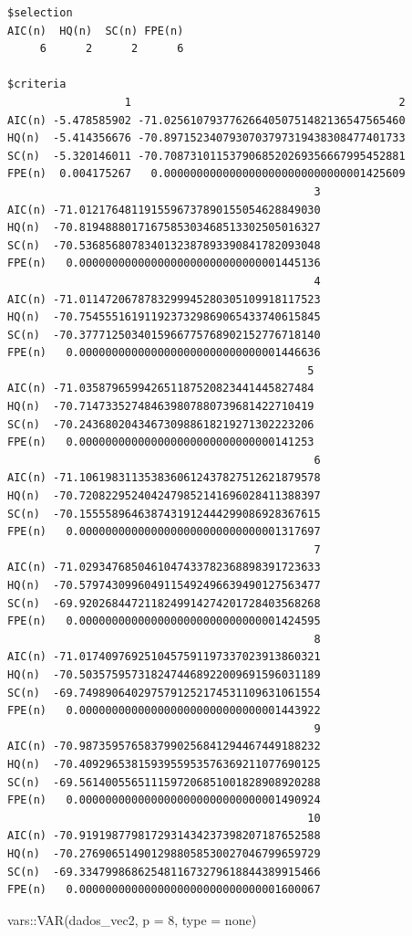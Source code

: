 \documentclass[
  letterpaper,
  DIV=11,
  numbers=noendperiod]{scrartcl}
\newenvironment{Shaded}{\begin{snugshade}}{\end{snugshade}}
\newcommand{\AttributeTok}[1]{\textcolor[rgb]{0.40,0.45,0.13}{#1}}
\newcommand{\DecValTok}[1]{\textcolor[rgb]{0.68,0.00,0.00}{#1}}
\newcommand{\FunctionTok}[1]{\textcolor[rgb]{0.28,0.35,0.67}{#1}}
\newcommand{\NormalTok}[1]{\textcolor[rgb]{0.00,0.23,0.31}{#1}}
\newcommand{\SpecialCharTok}[1]{\textcolor[rgb]{0.37,0.37,0.37}{#1}}
\newcommand{\StringTok}[1]{\textcolor[rgb]{0.13,0.47,0.30}{#1}}
\begin{document}
\begin{verbatim}
$selection
AIC(n)  HQ(n)  SC(n) FPE(n) 
     6      2      2      6 

$criteria
                  1                                         2
AIC(n) -5.478585902 -71.0256107937762664050751482136547565460
HQ(n)  -5.414356676 -70.8971523407930703797319438308477401733
SC(n)  -5.320146011 -70.7087310115379068520269356667995452881
FPE(n)  0.004175267   0.0000000000000000000000000000001425609
                                               3
AIC(n) -71.0121764811915596737890155054628849030
HQ(n)  -70.8194888017167585303468513302505016327
SC(n)  -70.5368568078340132387893390841782093048
FPE(n)   0.0000000000000000000000000000001445136
                                               4
AIC(n) -71.0114720678783299945280305109918117523
HQ(n)  -70.7545551619119237329869065433740615845
SC(n)  -70.3777125034015966775768902152776718140
FPE(n)   0.0000000000000000000000000000001446636
                                              5
AIC(n) -71.035879659942651187520823441445827484
HQ(n)  -70.714733527484639807880739681422710419
SC(n)  -70.243680204346730988618219271302223206
FPE(n)   0.000000000000000000000000000000141253
                                               6
AIC(n) -71.1061983113538360612437827512621879578
HQ(n)  -70.7208229524042479852141696028411388397
SC(n)  -70.1555589646387431912444299086928367615
FPE(n)   0.0000000000000000000000000000001317697
                                               7
AIC(n) -71.0293476850461047433782368898391723633
HQ(n)  -70.5797430996049115492496639490127563477
SC(n)  -69.9202684472118249914274201728403568268
FPE(n)   0.0000000000000000000000000000001424595
                                               8
AIC(n) -71.0174097692510457591197337023913860321
HQ(n)  -70.5035759573182474468922009691596031189
SC(n)  -69.7498906402975791252174531109631061554
FPE(n)   0.0000000000000000000000000000001443922
                                               9
AIC(n) -70.9873595765837990256841294467449188232
HQ(n)  -70.4092965381593955953576369211077690125
SC(n)  -69.5614005565111597206851001828908920288
FPE(n)   0.0000000000000000000000000000001490924
                                              10
AIC(n) -70.9191987798172931434237398207187652588
HQ(n)  -70.2769065149012988058530027046799659729
SC(n)  -69.3347998686254811673279618844389915466
FPE(n)   0.0000000000000000000000000000001600067
\end{verbatim}

\begin{Shaded}
\begin{Highlighting}[]
\NormalTok{vars}\SpecialCharTok{::}\FunctionTok{VAR}\NormalTok{(dados\_vec2, }\AttributeTok{p =} \DecValTok{8}\NormalTok{, }\AttributeTok{type =} \StringTok{\textquotesingle{}none\textquotesingle{}}\NormalTok{)}
\end{Highlighting}
\end{Shaded}
\end{document}
